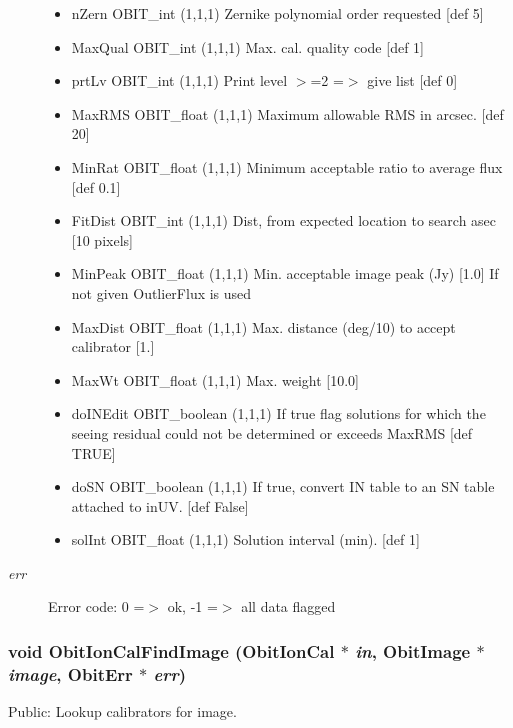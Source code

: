 \begin{Desc}
\begin{description}
\begin{itemize}
\item n\-Zern OBIT\_\-int (1,1,1) Zernike polynomial order requested [def 5] \item Max\-Qual OBIT\_\-int (1,1,1) Max. cal. quality code [def 1] \item prt\-Lv OBIT\_\-int (1,1,1) Print level $>$=2 =$>$ give list [def 0] \item Max\-RMS OBIT\_\-float (1,1,1) Maximum allowable RMS in arcsec. [def 20] \item Min\-Rat OBIT\_\-float (1,1,1) Minimum acceptable ratio to average flux [def 0.1] \item Fit\-Dist OBIT\_\-int (1,1,1) Dist, from expected location to search asec [10 pixels] \item Min\-Peak OBIT\_\-float (1,1,1) Min. acceptable image peak (Jy) [1.0] If not given Outlier\-Flux is used \item Max\-Dist OBIT\_\-float (1,1,1) Max. distance (deg/10) to accept calibrator [1.] \item Max\-Wt OBIT\_\-float (1,1,1) Max. weight [10.0] \item do\-INEdit OBIT\_\-boolean (1,1,1) If true flag solutions for which the seeing residual could not be determined or exceeds Max\-RMS [def TRUE] \item do\-SN OBIT\_\-boolean (1,1,1) If true, convert IN table to an SN table attached to in\-UV. [def False] \item sol\-Int OBIT\_\-float (1,1,1) Solution interval (min). [def 1] \end{itemize}
\item[{\em err}]Error code: 0 =$>$ ok, -1 =$>$ all data flagged \end{description}
\end{Desc}
\subsubsection{\setlength{\rightskip}{0pt plus 5cm}void Obit\-Ion\-Cal\-Find\-Image ({\bf Obit\-Ion\-Cal} $\ast$ {\em in}, {\bf Obit\-Image} $\ast$ {\em image}, {\bf Obit\-Err} $\ast$ {\em err})}\label{ObitIonCal_8h_a11}


Public: Lookup calibrators for image. 

